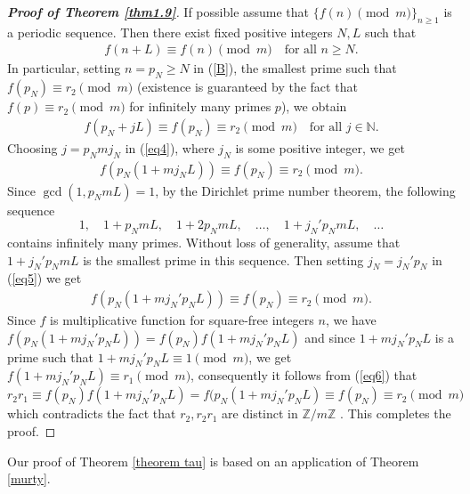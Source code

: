 \documentclass[12pt,reqno]{amsart}
\begin{document}
\begin{proof}[\textbf{Proof of Theorem \ref{thm1.9}}]
 If possible assume that $\{f(n) \pmod{m}\}_{n\geq 1}$ is a periodic sequence. Then there exist fixed positive integers $N,L$ such that
 \begin{align}\label{B}
  f(n+L)\equiv f(n) \pmod{m}\quad \text{for all~}n\geq N.   
 \end{align}
In particular, setting $n=p_N\geq N$ in (\ref{B}), the smallest prime such that $f(p_N)\equiv r_2\pmod{m}$ (existence is guaranteed by the fact that $f(p)\equiv r_2\pmod{m}$ for infinitely many primes $p$), we obtain
\begin{align}\label{eq4}
f(p_N+jL)\equiv f(p_N)\equiv r_2\pmod{m}\quad \text{for all~}j\in\mathbb{N}.    
\end{align}
Choosing $j=p_Nmj_N$ in (\ref{eq4}), where $j_N$ is some positive integer, we get
\begin{align}\label{eq5}
f(p_N(1+mj_NL))\equiv f(p_N)\equiv r_2\pmod{m}.    
\end{align}
Since $\gcd(1,p_NmL)=1$, by the Dirichlet prime number theorem, the following sequence
$$1, \quad 1+p_NmL, \quad 1+2p_NmL,\quad \ldots,\quad 1+j_N'p_NmL,\quad \ldots$$
contains infinitely many primes. Without loss of generality, assume that $1+j_N'p_NmL$ is the smallest prime in this sequence. Then setting $j_N=j_N'p_N$ in (\ref{eq5}) we get
\begin{align}\label{eq6}
f(p_N(1+mj_N'p_NL))\equiv f(p_N)\equiv r_2\pmod{m}.    
\end{align}
Since $f$ is multiplicative function for square-free integers $n$, we have $f(p_N(1+mj_N'p_NL))=f(p_N)f(1+mj_N'p_NL)$ and since $1+mj_N'p_NL$ is a prime such that $1+mj_N'p_NL\equiv 1 \pmod{m}$, we get $f(1+mj_N'p_NL)\equiv r_1\pmod{m}$, consequently it follows from (\ref{eq6}) that
$$r_2r_1\equiv f(p_N)f(1+mj_N'p_NL) =f(p_N(1+mj_N'p_NL)\equiv f(p_N)\equiv r_2\pmod{m}$$
which contradicts the fact that $r_2,r_2r_1$ are distinct in $\mathbb{Z}/m\mathbb{Z}$ . This completes the proof.   
\end{proof}
Our proof of Theorem \ref{theorem tau} is based on an application of Theorem \ref{murty}.
\end{document}
